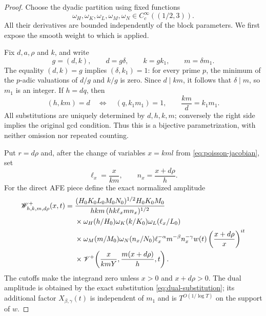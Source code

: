 \begin{proof}
Choose the dyadic partition using fixed functions
\[
 \omega_H,\omega_K,\omega_L,\omega_M,\omega_N
 \in C_c^\infty((1/2,3)).
\]
All their derivatives are bounded independently of the block parameters.
We first expose the smooth weight to which
 is applied.

Fix $d,a,\rho$ and $k$, and write
\begin{equation}\label{eq:d-k-split}
 g=(d,k),\qquad d=g\delta,\qquad k=gk_1,\qquad m=\delta m_1.
\end{equation}
The equality $(d,k)=g$ implies $(\delta,k_1)=1$: for every prime $p$,
the minimum of the $p$-adic valuations of $d/g$ and $k/g$ is zero.
Since $d\mid km$, it follows that $\delta\mid m$, so $m_1$ is an integer.
If $h=dq$, then
\begin{equation}\label{eq:exact-coprimality}
 (h,km)=d
 \quad\Longleftrightarrow\quad
 (q,k_1m_1)=1,
 \qquad \frac{km}{d}=k_1m_1.
\end{equation}
All substitutions are uniquely determined by $d,h,k,m$; conversely the
right side implies the original gcd condition.  Thus this is a bijective
parametrization, with neither omission nor repeated counting.

Put $r=d\rho$ and, after the change of variables $x=kml$ from
\eqref{eq:poisson-jacobian}, set
\begin{equation}\label{eq:completed-l-n-x}
 \ell_x=\frac{x}{km},\qquad n_x=\frac{x+d\rho}{h}.
\end{equation}
For the direct AFE piece define the exact normalized amplitude
\begin{align}
 \mathscr W^+_{h,k,m,d\rho}(x,t)
 ={}&
 \frac{(H_0K_0L_0M_0N_0)^{1/2}H_0K_0M_0}
 {hkm\,(hk\ell_xmn_x)^{1/2}}\notag\\
 &\times\omega_H(h/H_0)\omega_K(k/K_0)
 \omega_L(\ell_x/L_0)\notag\\
 &\times\omega_M(m/M_0)\omega_N(n_x/N_0)
 \ell_x^{-\alpha}m^{-\beta}n_x^{-\gamma}
 w(t)\left(\frac{x+d\rho}{x}\right)^{it}
 \notag\\
 &\times
 \mathscr V^+\!\left(\frac{x}{kmY},\frac{m(x+d\rho)}h,t\right).
 \label{eq:completed-normalized-amplitude}
\end{align}
The cutoffs make the integrand zero unless $x>0$ and $x+d\rho>0$.
The dual amplitude is obtained by the exact substitution
\eqref{eq:dual-substitution}; its additional factor
$X_{\beta,\gamma}(t)$ is independent of $m_1$ and is
$T^{O(1/\log T)}$ on the support of $w$.


\end{proof}

